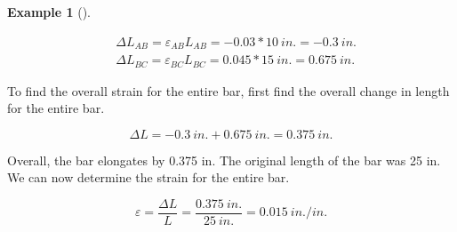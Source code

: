 \documentclass[
  letterpaper,
  DIV=11,
  numbers=noendperiod]{scrreprt}
\theoremstyle{definition}
\newtheorem{example}{Example}[chapter]
\theoremstyle{remark}
\begin{document}
\begin{tcolorbox}
\begin{example}[]
\begin{tcolorbox}
\[
\begin{aligned}
& \Delta L_{A B}=\varepsilon_{A B} L_{A B}=-0.03 * 10{~in.}=-0.3{~in.} \\
& \Delta L_{B C}=\varepsilon_{B C} L_{B C}=0.045 * 15{~in.}=0.675{~in.}
\end{aligned}
\]

To find the overall strain for the entire bar, first find the overall
change in length for the entire bar.

\[
\Delta L=-0.3{~in.}+0.675{~in.}=0.375{~in.}
\]

Overall, the bar elongates by 0.375 in. The original length of the bar
was 25 in. We can now determine the strain for the entire bar.

\[
\varepsilon=\frac{\Delta L}{L}=\frac{0.375{~in.}}{25{~in.}}=0.015{~in./in.}
\]

\end{tcolorbox}

\end{example}

\end{tcolorbox}
\end{document}
